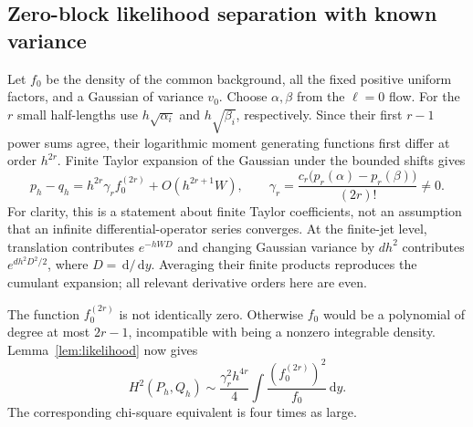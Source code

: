 \documentclass[11pt,a4paper]{article}
\numberwithin{equation}{section}
\theoremstyle{definition}
\theoremstyle{remark}
\newcommand{\dd}{\,\mathrm d}
\begin{document}
\subsection{Zero-block likelihood separation with known variance}
Let $f_0$ be the density of the common background, all the fixed positive
uniform factors, and a Gaussian of variance $v_0$. Choose
$\alpha,\beta$ from the $\ell=0$ flow. For the $r$ small half-lengths use
$h\sqrt{\alpha_i}$ and $h\sqrt{\beta_i}$, respectively. Since their first
$r-1$ power sums agree, their logarithmic moment generating functions first
differ at order $h^{2r}$. Finite Taylor expansion of the Gaussian under the
bounded shifts gives
\begin{equation}
 p_h-q_h=h^{2r}\gamma_r f_0^{(2r)}+O(h^{2r+1}W),\qquad
 \gamma_r=\frac{c_r\bigl(p_r(\alpha)-p_r(\beta)\bigr)}{(2r)!}\ne0.
 \label{eq:knownzerojet}
\end{equation}
For clarity, this is a statement about finite Taylor coefficients, not an
assumption that an infinite differential-operator series converges. At the
finite-jet level, translation contributes $e^{-hWD}$ and changing Gaussian
variance by $d h^2$ contributes $e^{d h^2D^2/2}$, where $D=\dd/\dd y$.
Averaging their finite products reproduces the cumulant expansion; all
relevant derivative orders here are even.

The function $f_0^{(2r)}$ is not identically zero. Otherwise $f_0$ would be a
polynomial of degree at most $2r-1$, incompatible with being a nonzero
integrable density. Lemma~\ref{lem:likelihood} now gives
\begin{equation}
 H^2(P_h,Q_h)\sim\frac{\gamma_r^2 h^{4r}}{4}
       \int\frac{(f_0^{(2r)})^2}{f_0}\dd y.
 \label{eq:knownzerohell}
\end{equation}
The corresponding chi-square equivalent is four times as large.
\end{document}
